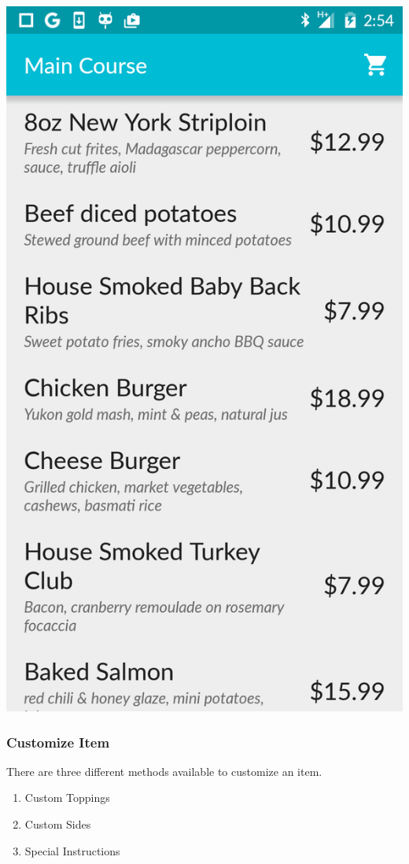 \documentclass[12pt, titlepage]{article}
\begin{document}
\begin{center}\includegraphics[scale=0.15]{appetizers.png}\end{center}

 
\subsubsection{Customize Item}
There are three different methods available to customize an item. 

\begin{enumerate}
  \item Custom Toppings
  \item Custom Sides
  \item Special Instructions
\end{enumerate}
\end{document}
